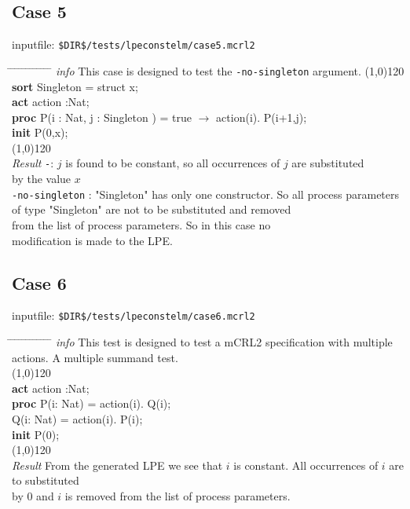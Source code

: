 \index{}\documentclass[a4paper,10pt]{article}
\theoremstyle{plain}
\theoremstyle{definition}
\newcommand{\pps}{process parameters}
\newcommand{\ti}{\textit}
\newcommand{\tb}{\textbf}
\newcommand{\tabw}{\hspace*{15.mm} \= \hspace*{20.mm} \= \hspace*{5.mm} \= \hspace*{5.mm} \= \hspace*{5.mm} \= \hspace*{5.mm}  \= \hspace*{5.mm}  \= \hspace*{5.mm}  \= \hspace*{5.mm} \= \hspace*{5.mm} \= \hspace*{5.mm}  \= \hspace*{5.mm}  \= \hspace*{5.mm}\kill}
\begin{document}
\subsection*{Case 5}
inputfile: \verb"$DIR$/tests/lpeconstelm/case5.mcrl2"
\begin{tabbing}
\tabw
\ti{info} \> This case is designed to test the \verb"-no-singleton" argument. 
\line(1,0){120}\\
\tb{sort} \> Singleton = struct x; \\
\tb{act}  \> action :Nat; \\
\tb{proc} \>  P(i : Nat, j : Singleton ) = true $\rightarrow$ action(i). P(i+1,j); \\
\tb{init} \>  P(0,x); \\
\line(1,0){120}\\
\ti{Result} \> 
\verb"-": \> \> $j$ is found to be constant, so all occurrences of $j$ are substituted  \\
\> \> \> by the value $x$\\
\> \verb"-no-singleton" : \> \> "Singleton" has only one constructor. So all \pps\  \\
\> \> \>                       of type "Singleton" are not to be substituted and removed  \\
\> \> \>                       from the list of \pps . So in this case no  \\
\> \> \>                       modification is made to the LPE.
\end{tabbing}
\newpage
\subsection*{Case 6}
inputfile: \verb"$DIR$/tests/lpeconstelm/case6.mcrl2"
\begin{tabbing}
\tabw
\ti{info} \> This test is designed to test a mCRL2 specification with multiple actions. 
          \> A multiple summand test. \\
\line(1,0){120}\\
\tb{act} \> action :Nat;\\
\tb{proc} \> P(i: Nat) = \>  action(i). Q(i);\\
     \> Q(i: Nat) = \>  action(i). P(i);\\

\tb{init} \> P(0);\\
\line(1,0){120}\\
\ti{Result} \> From the generated LPE we see that $i$ is constant. All occurrences of $i$ are to substituted \\
 \> by 0 and $i$ is removed from the list of \pps .
\end{tabbing}
\end{document}
